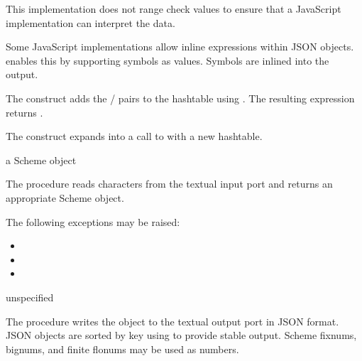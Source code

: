 This implementation does not range check values to ensure that a
JavaScript implementation can interpret the data.

Some JavaScript implementations allow inline expressions within JSON
objects.  enables this by supporting symbols as
values. Symbols are inlined into the output.

\begin{syntax}
\end{syntax}

The  construct adds the  /
 pairs to the hashtable  using
. The resulting expression returns .

\begin{syntax}
\end{syntax}

The  construct expands into a call to
 with a new hashtable.

\begin{procedure}
\end{procedure}
\returns{} a Scheme object

The  procedure reads characters from the textual
input port  and returns an appropriate Scheme object.

The following exceptions may be raised:
\begin{itemize}
\item {}
\item {}
\item {}
\end{itemize}

\begin{procedure}
\end{procedure}
\returns{} unspecified

The  procedure writes the object  to the
textual output port  in JSON format. JSON objects are sorted
by key using  to provide stable output. Scheme fixnums,
bignums, and finite flonums may be used as numbers.

